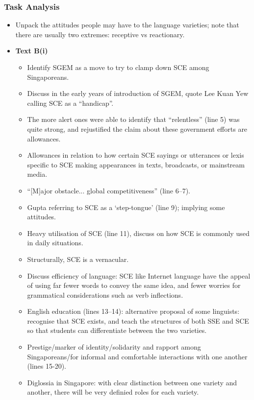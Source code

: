 \documentclass[../main.tex]{subfiles}
\begin{document}
        \subsubsection*{Task Analysis}
        \begin{itemize}
            \item Unpack the attitudes people may have to the language varieties; note that there are usually two extremes: receptive vs reactionary.
            \item \textbf{Text B(i)} \begin{itemize}
                \item Identify SGEM as a move to try to clamp down SCE among Singaporeans.
                \item Discuss in the early years of introduction of SGEM, quote Lee Kuan Yew calling SCE as a ``handicap''.
                \item The more alert ones were able to identify that ``relentless'' (line 5) was quite strong, and rejustified the claim about these government efforts are allowances.
                \item Allowances in relation to how certain SCE sayings or utterances or lexis specific to SCE making appearances in texts, broadcasts, or mainstream media.
                \item ``[M]ajor obstacle... global competitiveness'' (line 6--7).
                \item Gupta referring to SCE as a `step-tongue' (line 9); implying some attitudes.
                \item Heavy utilisation of SCE (line 11), discuss on how SCE is commonly used in daily situations.
                \item Structurally, SCE is a vernacular.
                \item Discuss efficiency of language: SCE like Internet language have the appeal of using far fewer words to convey the same idea, and fewer worries for grammatical considerations such as verb inflections. 
                \item English education (lines 13--14): alternative proposal of some linguists: recognise that SCE exists, and teach the structures of both SSE and SCE so that students can differentiate between the two varieties. 
                \item Prestige/marker of identity/solidarity and rapport among Singaporeans/for informal and comfortable interactions with one another (lines 15-20).
                \item Diglossia in Singapore: with clear distinction between one variety and another, there will be very definied roles for each variety.

\end{itemize}
\end{itemize}
\end{document}

